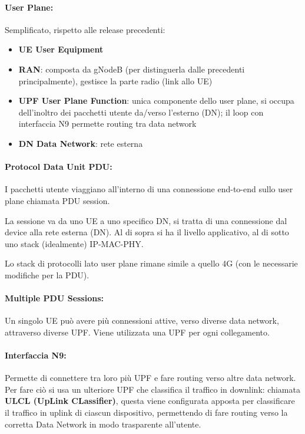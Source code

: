 \paragraph{User Plane:} Semplificato, rispetto alle release precedenti: 
\begin{itemize}
	\item \textbf{UE User Equipment}

	\item \textbf{RAN}: composta da gNodeB (per distinguerla dalle precedenti principalmente), gestisce la parte radio (link allo UE)

	\item \textbf{UPF User Plane Function}: unica componente dello user plane, si occupa dell'inoltro dei pacchetti utente da/verso l'esterno (DN); il loop con interfaccia N9 permette routing tra data network

	\item \textbf{DN Data Network}: rete esterna
\end{itemize}

\paragraph{Protocol Data Unit PDU:} I pacchetti utente viaggiano all'interno di una connessione end-to-end sullo user plane chiamata PDU session. 

La sessione va da uno UE a uno specifico DN, si tratta di una connessione dal device alla rete esterna (DN). Al di sopra si ha il livello applicativo, al di sotto uno stack (idealmente) IP-MAC-PHY.

Lo stack di protocolli lato user plane rimane simile a quello 4G (con le necessarie modifiche per la PDU).

\paragraph{Multiple PDU Sessions:} Un singolo UE può avere più connessioni attive, verso diverse data network, attraverso diverse UPF. Viene utilizzata una UPF per ogni collegamento.

\paragraph{Interfaccia N9:} Permette di connettere tra loro più UPF e fare routing verso altre data network. Per fare ciò si usa un ulteriore UPF che classifica il traffico in downlink: chiamata \textbf{ULCL (UpLink CLassifier)}, questa viene configurata apposta per classificare il traffico in uplink di ciascun dispositivo, permettendo di fare routing verso la corretta Data Network in modo trasparente all'utente.

